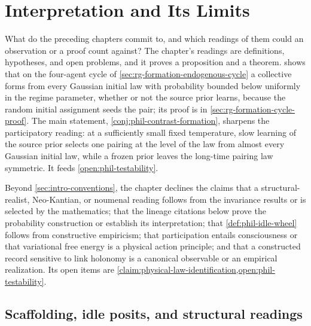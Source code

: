 \chapter{Interpretation and Its Limits}
\label{ch:philosophy}

What do the preceding chapters commit to, and which readings of them could an
observation or a proof count against? The chapter's readings are definitions,
hypotheses, and open problems, and it proves a proposition and a theorem.
 shows that on the four-agent cycle
of \cref{sec:rg-formation-endogenous-cycle} a collective forms from every
Gaussian initial law with probability bounded below uniformly in the regime
parameter, whether or not the source prior learns, because the random initial
assignment seeds the pair; its proof is in \cref{sec:rg-formation-cycle-proof}.
The main statement, \cref{conj:phil-contrast-formation}, sharpens the
participatory reading: at a sufficiently small fixed temperature, slow learning of the source
prior selects one pairing at the level of the law from almost every Gaussian
initial law, while a frozen prior leaves the long-time pairing law symmetric.
It feeds \cref{open:phil-testability}.

Beyond \cref{sec:intro-conventions}, the chapter declines the claims that a
structural-realist, Neo-Kantian, or noumenal reading follows from the invariance
results or is selected by the mathematics; that the lineage citations below
prove the probability construction or establish its interpretation; that
\cref{def:phil-idle-wheel} follows from constructive empiricism; that
participation entails consciousness or that variational free energy is a
physical action principle; and that a constructed record sensitive to link
holonomy is a canonical observable or an empirical realization. Its open items
are \cref{claim:physical-law-identification,open:phil-testability}.

\section{Scaffolding, idle posits, and structural readings}
\label{sec:phil-base}
\label{sec:phil-noumenon}
\label{sec:phil-realism}

